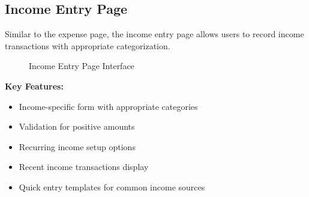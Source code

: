 \subsection{Income Entry Page}

Similar to the expense page, the income entry page allows users to record income transactions with appropriate categorization.

\begin{figure}[h]
\centering
{}
\caption{Income Entry Page Interface}
\label{fig:income}
\end{figure}

\textbf{Key Features:}
\begin{itemize}
    \item Income-specific form with appropriate categories
    \item Validation for positive amounts
    \item Recurring income setup options
    \item Recent income transactions display
    \item Quick entry templates for common income sources
\end{itemize}

